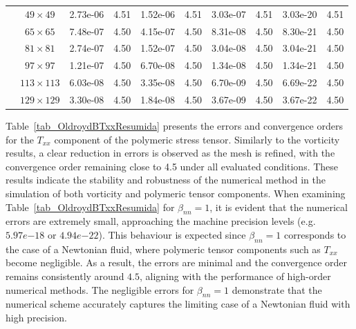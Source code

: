 \documentclass[preprint, 12pt]{elsarticle}
\begin{document}
\begin{center}
\begin{table}[H]
{\begin{tabular*}{\textwidth}{@{\extracolsep\fill}cccccccccc@{}}
    & $49\times 49$ & 2.73e-06 & 4.51 & 1.52e-06 & 4.51 & 3.03e-07 & 4.51 & 3.03e-20 & 4.51 \\
    & $65\times 65$ & 7.48e-07 & 4.50 & 4.15e-07 & 4.50 & 8.31e-08 & 4.50 & 8.30e-21 & 4.50 \\
    & $81\times 81$ & 2.74e-07 & 4.50 & 1.52e-07 & 4.50 & 3.04e-08 & 4.50 & 3.04e-21 & 4.50 \\
    & $97\times 97$ & 1.21e-07 & 4.50 & 6.70e-08 & 4.50 & 1.34e-08 & 4.50 & 1.34e-21 & 4.50 \\
    & $113\times 113$ & 6.03e-08 & 4.50 & 3.35e-08 & 4.50 & 6.70e-09 & 4.50 & 6.69e-22 & 4.50 \\
    & $129\times 129$ & 3.30e-08 & 4.50 & 1.84e-08 & 4.50 & 3.67e-09 & 4.50 & 3.67e-22 & 4.50 \\
    \hline
    \end{tabular*}
}
\end{table}
\end{center}

Table~\ref{tab_OldroydBTxxResumida} presents the errors and convergence orders for the $T_{xx}$ component of the polymeric stress tensor. Similarly to the vorticity results, a clear reduction in errors is observed as the mesh is refined, with the convergence order remaining close to 4.5 under all evaluated conditions. These results indicate the stability and robustness of the numerical method in the simulation of both vorticity and polymeric tensor components. When examining Table~\ref{tab_OldroydBTxxResumida} for $\beta_{nn} = 1$, it is evident that the numerical errors are extremely small, approaching the machine precision levels (e.g. $5.97e{-18}$ or $4.94e{-22}$). This behaviour is expected since $\beta_{nn} = 1$ corresponds to the case of a Newtonian fluid, where polymeric tensor components such as $T_{xx}$ become negligible. As a result, the errors are minimal and the convergence order remains consistently around $4.5$, aligning with the performance of high-order numerical methods. The negligible errors for $\beta_{nn} = 1$ demonstrate that the numerical scheme accurately captures the limiting case of a Newtonian fluid with high precision.
\end{document}

